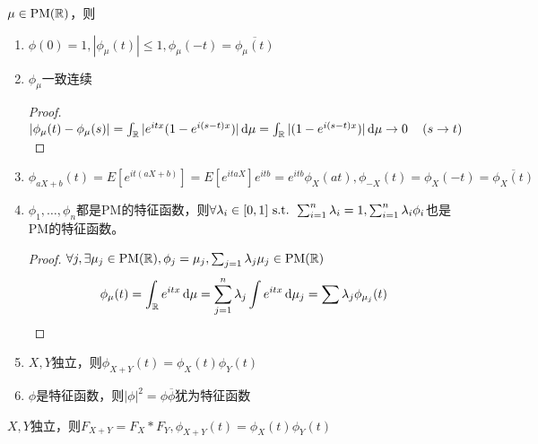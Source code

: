 \documentclass{ctexbook}
\begin{document}
\begin{Thm}
  $\mu\in \mathrm{PM}(\mathbb{R})$，则
  
\begin{enumerate}
\item $\phi(0)=1, |\phi_{\mu}(t)|\leq 1, \phi_{\mu}(-t)=\overline{\phi_{\mu}(t)}$
\item $\phi_{\mu}$一致连续  
\begin{proof}
  $|\phi_{\mu}(t)-\phi_{\mu}(s)|=\int_{\mathbb{R}}|e^{itx}(1-e^{i(s-t)x})|\,\mathrm{d} \mu=\int_{\mathbb{R}}|(1-e^{i(s-t)x})|\,\mathrm{d} \mu\to 0 \quad \left( s\to t \right)$
\end{proof}
\item $\phi_{aX+b}(t)=E[e^{it(aX+b)}]=E[e^{itaX}]e^{itb}=e^{itb}\phi_X(at), \phi_{-X}(t)=\phi_{X}(-t)= \overline{\phi_X(t)}$
\item $\phi_1,\dots,\phi_n$都是$\mathrm{PM}$的特征函数，则$\forall \lambda_{i}\in [0,1]\text{ s.t. } \sum_{i=1}^{n}\lambda_{i}=1, \sum_{i=1}^n\lambda_i\phi_i$也是$\mathrm{PM}$的特征函数。
  \begin{proof}
    $\forall j,\exists \mu_j\in \mathrm{PM}(\mathbb{R}),\phi_j=\mu_j,\sum_{j=1}\lambda_j\mu_j\in \mathrm{PM}(\mathbb{R})$ 
\begin{equation}
\phi_{\mu}(t)=\int_{\mathbb{R}}e^{itx}\,\mathrm{d}\mu=\sum_{j=1}^n\lambda_j\int e^{itx}\,\mathrm{d}\mu_j=\sum\lambda_j\phi_{\mu_j}(t)
\end{equation}
  \end{proof}
\item $X,Y$独立，则$\phi_{X+Y}(t)=\phi_X(t)\phi_Y(t)$
\item $\phi$是特征函数，则$|\phi|^2=\phi \overline{\phi}$犹为特征函数
\end{enumerate}
\end{Thm}

\begin{Rmk}
  $X,Y$独立，则$F_{X+Y}=F_X*F_Y, \phi_{X+Y}(t)=\phi_X(t)\phi_Y(t)$
\end{Rmk}
\end{document}
